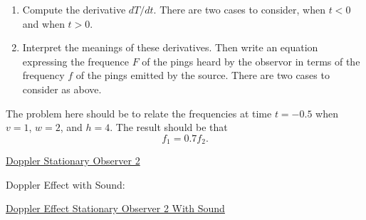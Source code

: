 \documentclass{ximera}
\begin{document}
\begin{example}
\begin{enumerate}
\item Compute the derivative $dT/dt$. There are two cases to consider, when $t<0$ and when $t>0$.

\item Interpret the meanings of these derivatives. Then write an equation expressing the frequence $F$ of the pings heard by the observor in terms of the frequency $f$ of the pings emitted by the source. There are two cases to consider as above. 
\end{enumerate}

\end{example}


The problem here should be to relate the frequencies at time $t=-0.5$ when $v=1$, $w=2$, and $h=4$. The result should be that 
\[
    f_1 = 0.7 f_2 . 
\]


\begin{onlineOnly}
    \begin{center}
\end{center}
\end{onlineOnly}

\href{https://www.desmos.com/calculator/celviaogz7}{Doppler Stationary Observer 2}

Doppler Effect with Sound:

\begin{onlineOnly}
    \begin{center}
\end{center}
\end{onlineOnly}

\href{https://www.desmos.com/calculator/gxzmjpgkrr}{Doppler Effect Stationary Observer 2 With Sound}
\end{document}
